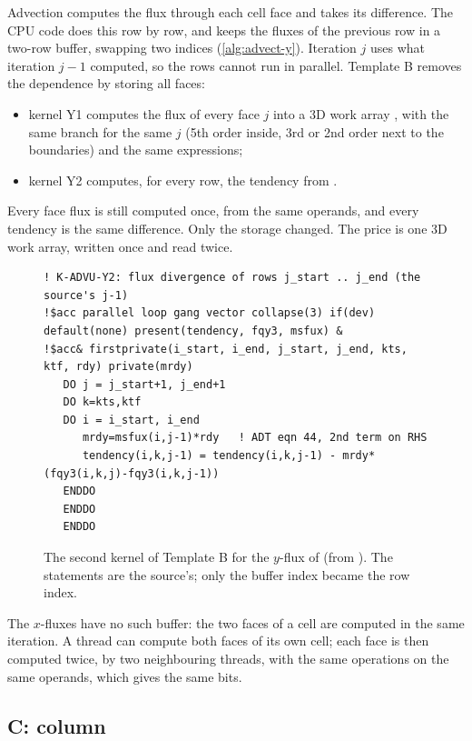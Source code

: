 Advection computes the flux through each cell face and takes its difference. The CPU code does this row by row, and
keeps the fluxes of the previous row in a two-row buffer, swapping two indices (\cref{alg:advect-y}). Iteration $j$
uses what iteration $j-1$ computed, so the rows cannot run in parallel. Template B removes the dependence by storing
all faces:
\begin{itemize}
  \item kernel Y1 computes the flux of every face $j$ into a 3D work array , with the same branch
    for the same $j$ (5th order inside, 3rd or 2nd order next to the boundaries) and the same expressions;
  \item kernel Y2 computes, for every row, the tendency from .
\end{itemize}
Every face flux is still computed once, from the same operands, and every tendency is the same difference. Only the
storage changed. The price is one 3D work array, written once and read twice.

\begin{figure}[ht]
\begin{lstlisting}[basicstyle=\ttfamily\footnotesize]
   ! K-ADVU-Y2: flux divergence of rows j_start .. j_end (the source's j-1)
!$acc parallel loop gang vector collapse(3) if(dev) default(none) present(tendency, fqy3, msfux) &
!$acc& firstprivate(i_start, i_end, j_start, j_end, kts, ktf, rdy) private(mrdy)
   DO j = j_start+1, j_end+1
   DO k=kts,ktf
   DO i = i_start, i_end
      mrdy=msfux(i,j-1)*rdy   ! ADT eqn 44, 2nd term on RHS
      tendency(i,k,j-1) = tendency(i,k,j-1) - mrdy*(fqy3(i,k,j)-fqy3(i,k,j-1))
   ENDDO
   ENDDO
   ENDDO
\end{lstlisting}
\caption{The second kernel of Template B for the $y$-flux of  (from ).
The statements are the source's; only the buffer index became the row index.}
\label{lst:tmpl-b}
\end{figure}

The $x$-fluxes have no such buffer: the two faces of a cell are computed in the same iteration. A thread can compute
both faces of its own cell; each face is then computed twice, by two neighbouring threads, with the same operations
on the same operands, which gives the same bits.

\subsection{C: column}


